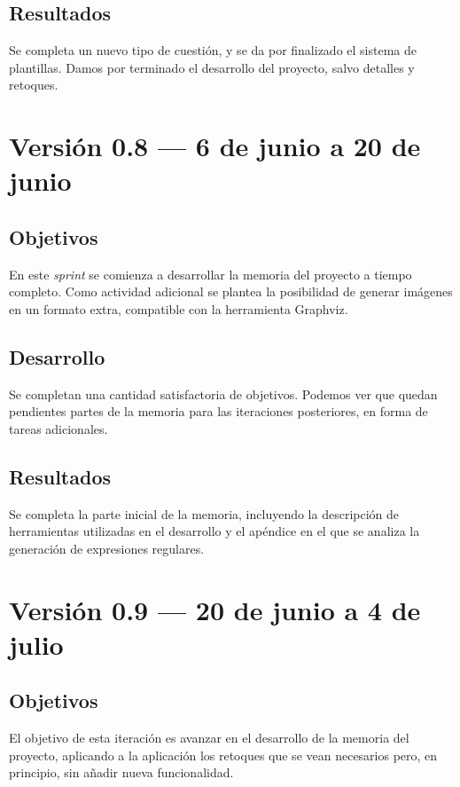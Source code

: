 
\subsection{Resultados}
Se completa un nuevo tipo de cuestión, y se da por finalizado el sistema de plantillas.
Damos por terminado el desarrollo del proyecto, salvo detalles y retoques.

\section{Versión 0.8 --- 6 de junio a 20 de junio}
\subsection{Objetivos}
En este \emph{sprint} se comienza a desarrollar la memoria del proyecto a tiempo completo.
Como actividad adicional se plantea la posibilidad de generar imágenes en un formato extra, compatible con la herramienta Graphviz.

\subsection{Desarrollo}
Se completan una cantidad satisfactoria de objetivos.
Podemos ver que quedan pendientes partes de la memoria para las iteraciones posteriores, en forma de tareas adicionales.


\subsection{Resultados}
Se completa la parte inicial de la memoria, incluyendo la descripción de herramientas utilizadas en el desarrollo y el apéndice en el que se analiza la generación de expresiones regulares.

\section{Versión 0.9 --- 20 de junio a 4 de julio}
\subsection{Objetivos}
El objetivo de esta iteración es avanzar en el desarrollo de la memoria del proyecto, aplicando a la aplicación los retoques que se vean necesarios pero, en principio, sin añadir nueva funcionalidad.

